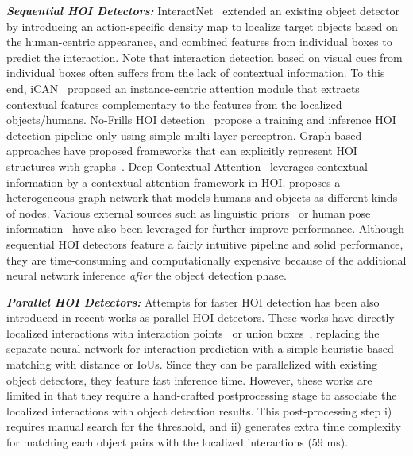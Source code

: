 \documentclass[final]{cvpr}
\begin{document}
\noindent\textbf{\textit{Sequential HOI Detectors:}}
InteractNet~\cite{gkioxari2018detecting} extended an existing object detector by introducing an action-specific density map to localize target objects based on the human-centric appearance, and combined features from individual boxes to predict the interaction.
Note that interaction detection based on visual cues from individual boxes often suffers from the lack of contextual information.\newline
To this end, iCAN~\cite{gao2018ican} proposed an instance-centric attention module that extracts contextual features complementary to the features from the localized objects/humans.
No-Frills HOI detection~\cite{gupta2019no} propose a training and inference HOI detection pipeline only using simple multi-layer perceptron.
Graph-based approaches have proposed frameworks that can explicitly represent HOI structures with graphs~\cite{qi2018learning,ulutan2020vsgnet,gao2020drg,wang2020contextual,liu2020consnet}.
Deep Contextual Attention~\cite{wang2019deep} leverages contextual information by a contextual attention framework in HOI.
\cite{wang2020contextual} proposes a heterogeneous graph network that models humans and objects as different kinds of nodes.
Various external sources such as linguistic priors~\cite{peyre2019detecting,xu2019learning,li2020pastanet,gao2020drg,bansal2020detecting,zhong2020polysemy,liu2020amplifying} or human pose information~\cite{li2020detailed,zhou2019relation,li2019transferable,gupta2019no,wan2019pose,zhou2019relation} have also been leveraged for further improve performance.
Although sequential HOI detectors feature a fairly intuitive pipeline and solid performance, they are time-consuming and computationally expensive because of the additional neural network inference \textit{after} the object detection phase.\newline

\noindent\textbf{\textit{Parallel HOI Detectors:}}
Attempts for faster HOI detection has been also introduced in recent works as parallel HOI detectors.
These works have directly localized interactions with interaction points~\cite{wang2020learning,liao2020ppdm} or union boxes~\cite{bkim2020uniondet}, replacing the separate neural network for interaction prediction with a simple heuristic based matching with distance or IoUs.
Since they can be parallelized with existing object detectors, they feature fast inference time.
However, these works are limited in that they require a hand-crafted postprocessing stage to associate the localized interactions with object detection results.
This post-processing step i) requires manual search for the threshold, and ii) generates extra time complexity for matching each object pairs with the localized interactions (59 ms).
\end{document}
